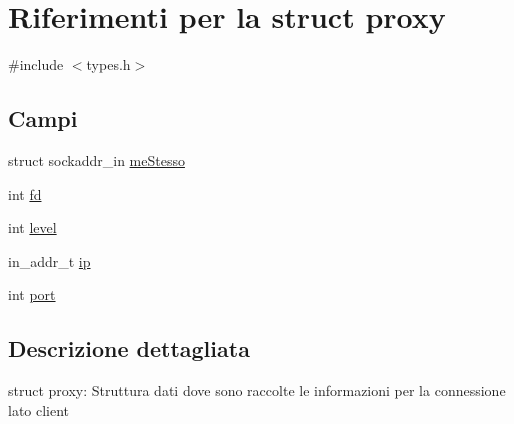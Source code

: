 \hypertarget{structproxy}{
\section{Riferimenti per la struct proxy}
\label{structproxy}
}


{\ttfamily \#include $<$types.h$>$}

\subsection*{Campi}
{\bf }\par
\begin{DoxyCompactItemize}
\item 
struct sockaddr\_\-in \hyperlink{structproxy_adf308cdebd9b8469203f9fe4853eae1f}{meStesso}
\item 
int \hyperlink{structproxy_a8c6d5c10908adaf299234cb136db7f0a}{fd}
\item 
int \hyperlink{structproxy_a9f8993de9d5183a0e089c527367bcfab}{level}
\item 
in\_\-addr\_\-t \hyperlink{structproxy_a8815d037163f8e46d1a65562abdd28cf}{ip}
\item 
int \hyperlink{structproxy_a339f078e8c6ad542d969105534e272a5}{port}
\end{DoxyCompactItemize}



\subsection{Descrizione dettagliata}
struct proxy: Struttura dati dove sono raccolte le informazioni per la connessione lato client 

